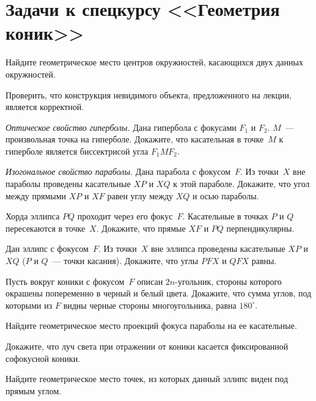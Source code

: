 
\section*{Задачи к спецкурсу <<Геометрия коник>>}


\begin{problems}

\item
Найдите геометрическое место центров окружностей, касающихся двух данных
окружностей.

\item
Проверить, что конструкция невидимого объекта, предложенного на лекции,
является корректной.

\item\emph{Оптическое свойство гиперболы.}
Дана гипербола с фокусами $F_1$ и $F_2$.
$M$~--- произвольная точка на гиперболе.
Докажите, что касательная в точке~$M$ к гиперболе является биссектрисой
угла $F_1 M F_2$.

\item\emph{Изогональное свойство параболы.}
Дана парабола с фокусом~$F$.
Из точки~$X$ вне параболы проведены касательные $XP$ и $XQ$ к этой параболе.
Докажите, что угол между прямыми $XP$ и $XF$ равен углу между $XQ$ и осью
параболы.

\item
Хорда эллипса $PQ$ проходит через его фокус~$F$.
Касательные в точках $P$ и $Q$ пересекаются в точке~$X$.
Докажите, что прямые $XF$ и $PQ$ перпендикулярны.

\item
Дан эллипс с фокусом~$F$.
Из точки~$X$ вне эллипса проведены касательные $XP$ и $XQ$
($P$ и $Q$~--- точки касания).
Докажите, что углы $PFX$ и $QFX$ равны.

\item
Пусть вокруг коники с фокусом~$F$ описан $2n$-угольник, стороны которого
окрашены попеременно в черный и белый цвета.
Докажите, что сумма углов, под которыми из $F$ видны черные стороны
многоугольника, равна $180^{\circ}$.

\item
Найдите геометрическое место проекций фокуса параболы на ее касательные.

\item
Докажите, что луч света при отражении от коники касается фиксированной
софокусной коники.

\item
Найдите геометрическое место точек, из которых данный эллипс виден под прямым
углом.

\end{problems}
  
